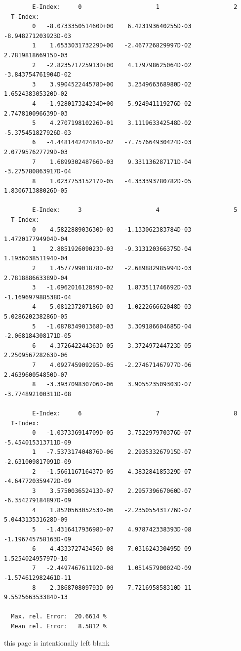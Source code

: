 \documentclass[12pt,dvips]{article}
\begin{document}
\begin{small}\begin{verbatim}
        E-Index:     0                     1                     2
  T-Index:
        0   -8.073335051460D+00    6.423193640255D-03   -8.948271203923D-03
        1    1.653303173229D+00   -2.467726829997D-02    2.781981866915D-03
        2   -2.823571725913D+00    4.179798625064D-02   -3.843754761904D-02
        3    3.990452244578D+00    3.234966368980D-02    1.652438305320D-02
        4   -1.928017324234D+00   -5.924941119276D-02    2.747810096639D-03
        5    4.270719810226D-01    3.111963342548D-02   -5.375451827926D-03
        6   -4.448144242484D-02   -7.757664930424D-03    2.077957627729D-03
        7    1.689930248766D-03    9.331136287171D-04   -3.275780863917D-04
        8    1.023775315217D-05   -4.333393780782D-05    1.830671388026D-05

        E-Index:     3                     4                     5
  T-Index:
        0    4.582288903630D-03   -1.133062383784D-03    1.472017794904D-04
        1    2.885192609023D-03   -9.313120366375D-04    1.193603851194D-04
        2    1.457779901878D-02   -2.689882985994D-03    2.781888663389D-04
        3   -1.096201612859D-02    1.873511746692D-03   -1.169697988538D-04
        4    5.081237207186D-03   -1.022266662048D-03    5.028620238286D-05
        5   -1.087834901368D-03    3.309186604685D-04   -2.068184308171D-05
        6   -4.372642244363D-05   -3.372497244723D-05    2.250956728263D-06
        7    4.092745909295D-05   -2.274671467977D-06    2.463960054850D-07
        8   -3.393709830706D-06    3.905523509303D-07   -3.774892100311D-08

        E-Index:     6                     7                     8
  T-Index:
        0   -1.037336914709D-05    3.752297970376D-07   -5.454015313711D-09
        1   -7.537317404876D-06    2.293533267915D-07   -2.631009817091D-09
        2   -1.566116716437D-05    4.383284185329D-07   -4.647720359472D-09
        3    3.575003652413D-07    2.295739667060D-07   -6.354279184897D-09
        4    1.852056305253D-06   -2.235055431776D-07    5.044313531628D-09
        5   -1.431641793698D-07    4.978742338393D-08   -1.196745758163D-09
        6    4.433372743456D-08   -7.031624330495D-09    1.525402495797D-10
        7   -2.449746761192D-08    1.051457900024D-09   -1.574612982461D-11
        8    2.386870809793D-09   -7.721695858310D-11    9.552566353384D-13

  Max. rel. Error:  20.6614 %
  Mean rel. Error:   8.5812 %

\end{verbatim}\end{small}
\newpage
this page is intentionally left blank
\end{document}
